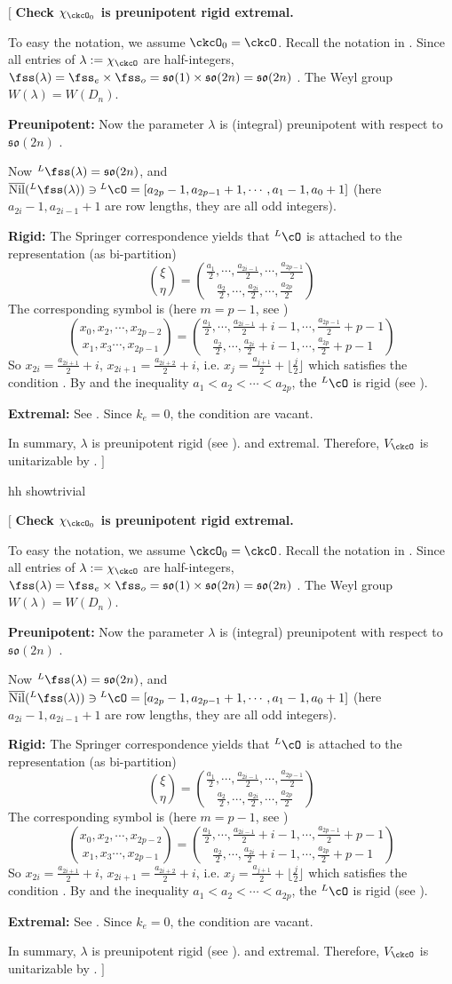 \documentclass[12pt,a4paper]{amsart}
\newcommand{\trivial}[2][]{\if\relax\detokenize{#1}\relax
{\color{Bittersweet} \vspace{0em} $[$  #2 $]$}
\else
\ifx#1h
\ifcsname showtrivial\endcsname
{\color{orange} \vspace{0em}  $[$ #2 $]$}
\fi
\else {\red Wrong argument!} \fi
\fi
}
\def\fso{\mathfrak{so}}
\numberwithin{equation}{section}
\theoremstyle{remark}
\def\floor#1{{\lfloor #1 \rfloor}}
\begin{document}
  \trivial[h]{
    {\bf Check $\chi_{\ckcO_0}$ is preunipotent rigid extremal.}

    To easy the notation, we assume $\ckcO_0 = \ckcO$.
    Recall the notation in \cite[Section~10]{B89}.
    Since all entries of $\lambda := \chi_{\ckcO}$ are half-integers,
    $\fss(\lambda) =\fss_e\times \fss_o =  \fso(1)\times \fso(2n) = \fso(2n)$
    \cite[(10.2.1)]{B89}.
    The Weyl group $W(\lambda) = W(D_n)$.

    {\bf Preunipotent: }Now the parameter $\lambda$ is (integral) preunipotent with respect to
    $\fso(2n)$ \cite[Definition~9.3, p146]{B89}.

    Now ${}^L\fss(\lambda) = \fso(2n)$, and $\overline{\mathrm{Nil}}({}^L\fss(\lambda)) \ni
    {}^L\cO = [a_{2p}-1, a_{2p-1}+1, \cdots, a_{1}-1, a_0+1]$ (here $a_{2i}-1,
    a_{2i-1}+1$ are row lengths, they are all odd integers).

    {\bf Rigid: }
    The Springer correspondence yields that ${}^L\cO$ is attached to the
    representation (as bi-partition)
    \[
      \binom{\xi}{\eta} = \binom{\frac{a_1}{2}, \cdots,
        \frac{a_{2i-1}}{2},\cdots,
        \frac{a_{2p-1}}{2}}{\frac{a_2}{2}, \cdots, \frac{a_{2i}}{2}, \cdots, \frac{a_{2p}}{2}}
    \]
    The corresponding symbol is (here $m=p-1$, see \cite[(6.3.1)]{B89})
    \[
      \binom{x_0, x_2, \cdots, x_{2p-2}}{x_1, x_3 \cdots, x_{2p-1} }
      = \binom{\frac{a_1}{2}, \cdots,
        \frac{a_{2i-1}}{2}+i-1,\cdots,
        \frac{a_{2p-1}}{2}+p-1}{
        \frac{a_2}{2}, \cdots, \frac{a_{2i}}{2}+i-1, \cdots, \frac{a_{2p}}{2}+p-1}
    \]
    So $x_{2i} = \frac{a_{2i+1}}{2}+i$, $x_{2i+1} = \frac{a_{2i+2}}{2}+i$, i.e.
    $x_j = \frac{a_{j+1}}{2} + \floor{\frac{j}{2}}$ which satisfies the condition
    \cite[(6.3.1)]{B89}.  By \cite[(9.6.13), (0.6.18)]{B89} and the inequality
    $a_1< a_2< \cdots < a_{2p}$, the ${}^L\cO$ is rigid (see
    \cite[Definition~9.6]{B89}).

    {\bf Extremal:} See \cite[Definition~10.3]{B89}.
    Since $k_e=0$, the condition \cite[(10.4.7a),(10.4.7b)]{B89} are vacant.

    In summary, $\lambda$ is preunipotent rigid (see \cite[last line, p150]{B89}).
    and extremal. Therefore, $V_{\ckcO}$ is unitarizable by \cite[Proposition~10.6]{B89}.
  }
\end{document}
